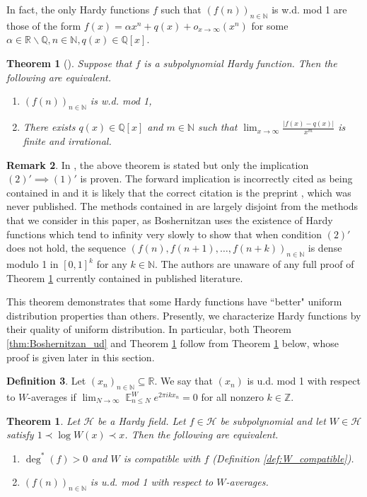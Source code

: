 \documentclass[12pt]{article}
\theoremstyle{plain} %
\newtheorem{theorem}{Theorem}[section]
\theoremstyle{definition} %
\newtheorem{definition}[theorem]{Definition}
\newtheorem{remark}[theorem]{Remark}
\theoremstyle{plain}
\newcounter{MainTheoremCounter}
\newtheorem{maintheorem}[MainTheoremCounter]{Theorem}
\theoremstyle{plain}
\numberwithin{equation}{section}
\newcommand{\N}{\mathbb{N}}
\newcommand{\Z}{\mathbb{Z}}
\newcommand{\R}{\mathbb{R}}
\newcommand{\Q}{\mathbb{Q}}
\renewcommand{\leq}{\leqslant}
\renewcommand{\setminus}{\backslash}
\renewcommand{\subset}{\subseteq}
\newcommand{\1}{\mathbbm{1}}
\newcommand{\E}{\operatorname{\mathbb{E}}}
\newcommand{\oo}{\infty}
\begin{document}
In fact, the only Hardy functions $f$ such that $(f(n))_{n\in \N}$ is w.d. mod 1 are those of the form $f(x) = \alpha x^n+q(x)+o_{x\to\oo}(x^n)$ for some $\alpha\in \R\setminus \Q, n\in \N, q(x)\in \Q[x]$.
\begin{theorem}[{\cite[Theorem 1.10]{Boshernitzan}}]\label{thm:Boshernitzan_wd}
    Suppose that $f$ is a subpolynomial Hardy function. Then the following are equivalent.
    \begin{enumerate}[label=$(\arabic*)'$]
        \item $(f(n))_{n\in \N}$ is w.d. mod 1,
        \item There exists $q(x)\in \Q[x]$ and $m\in \N$ such that $\lim_{x\to\oo}\frac{|f(x)-q(x)|}{x^{m}}$ is finite and irrational.
    \end{enumerate} 
\end{theorem}

\begin{remark}
    In \cite{Boshernitzan}, the above theorem is stated but only the implication $(2)'\implies (1)'$ is proven. The forward implication is incorrectly cited as being contained in \cite{Boshernitzan_wrong_citation} and it is likely that the correct citation is the preprint \cite{Boshernitzan_preprint}, which was never published. The methods contained in \cite{Boshernitzan_preprint} are largely disjoint from the methods that we consider in this paper, as Boshernitzan uses the existence of Hardy functions which tend to infinity very slowly to show that when condition $(2)'$ does not hold, the sequence $(f(n),f(n+1),\dots, f(n+k))_{n\in \N}$ is dense modulo 1 in $[0,1]^k$ for any $k\in \N$. The authors are unaware of any full proof of Theorem \ref{thm:Boshernitzan_wd} currently contained in published literature.

  
\end{remark}

This theorem demonstrates that some Hardy functions have ``better" uniform distribution properties than others. Presently, we characterize Hardy functions by their quality of uniform distribution. In particular, both Theorem \ref{thm:Boshernitzan_ud} and Theorem \ref{thm:Boshernitzan_wd} follow from Theorem \ref{thm:W_ud} below, whose proof is given later in this section.
\begin{definition}
Let $(x_n)_{n\in \N}\subset \R$. We say that $(x_n)$ is u.d. mod 1 with respect to $W$-averages if $\lim_{N\to\oo}\E_{n\leq N}^We^{2\pi i kx_n} = 0$ for all nonzero $k\in \Z$. 
\end{definition}
\begin{maintheorem}\label{thm:W_ud}
     Let $\mathcal{H}$ be a Hardy field. Let $f\in \mathcal{H}$ be subpolynomial and let $W\in \mathcal{H}$ satisfy $1\prec \log W(x)\prec x$. Then the following are equivalent.
     \begin{enumerate}[label=(\roman*)]
         \item $\deg^*(f)>0$ and $W$ is compatible with $f$ (Definition \ref{def:W_compatible}).
         \item $(f(n))_{n\in \N}$ is u.d. mod 1 with respect to $W$-averages.
     \end{enumerate}
\end{maintheorem}
\end{document}
